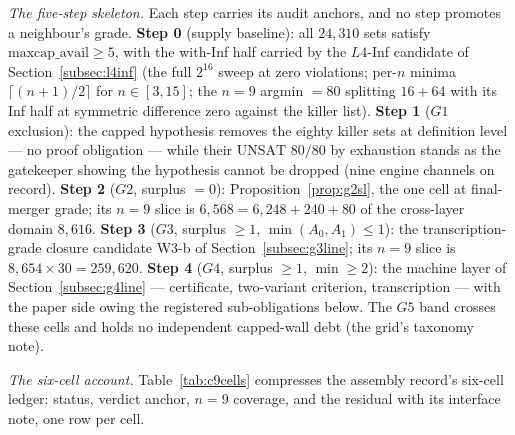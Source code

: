 \emph{The five-step skeleton.} Each step carries its audit anchors, and no
step promotes a neighbour's grade. \textbf{Step 0} (supply baseline): all
$24{,}310$ sets satisfy $\mathrm{maxcap\_avail}\ge5$, with the with-Inf half
carried by the $L4$-Inf candidate of Section~\ref{subsec:l4inf} (the full
$2^{16}$ sweep at zero violations; per-$n$ minima $\lceil(n+1)/2\rceil$ for
$n\in[3,15]$; the $n=9$ argmin $=80$ splitting $16+64$ with its Inf half at
symmetric difference zero against the killer list). \textbf{Step 1} ($G1$
exclusion): the capped hypothesis removes the eighty killer sets at definition
level --- no proof obligation --- while their $\mathrm{UNSAT}$ $80/80$ by
exhaustion stands as the gatekeeper showing the hypothesis cannot be dropped
(nine engine channels on record). \textbf{Step 2} ($G2$, surplus $=0$):
Proposition~\ref{prop:g2sl}, the one cell at final-merger grade; its $n=9$
slice is $6{,}568=6{,}248+240+80$ of the cross-layer domain $8{,}616$.
\textbf{Step 3} ($G3$, surplus $\ge1$, $\min(A_0,A_1)\le1$): the
transcription-grade closure candidate W3-b of Section~\ref{subsec:g3line};
its $n=9$ slice is $8{,}654\times30=259{,}620$. \textbf{Step 4} ($G4$,
surplus $\ge1$, $\min\ge2$): the machine layer of
Section~\ref{subsec:g4line} --- certificate, two-variant criterion,
transcription --- with the paper side owing the registered sub-obligations
below. The $G5$ band crosses these cells and holds no independent capped-wall
debt (the grid's taxonomy note).

\emph{The six-cell account.} Table~\ref{tab:c9cells} compresses the assembly
record's six-cell ledger: status, verdict anchor, $n=9$ coverage, and the
residual with its interface note, one row per cell.

